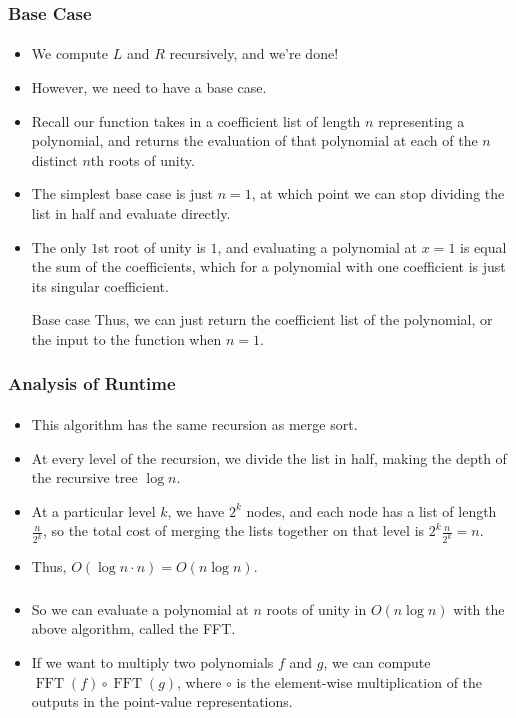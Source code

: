 \documentclass{beamer}                             %
\DeclareMathOperator{\FFT}{FFT}
\begin{document}
\begin{frame}
\frametitle{Base Case}
\framesubtitle{}
\begin{itemize}[<+->]
  \item We compute \( L \) and \( R \) recursively, and we're done!
  \item However, we need to have a base case.
  \item Recall our function takes in a coefficient list of length \( n \)
    representing a polynomial, and returns the evaluation of that polynomial
    at each of the \( n \) distinct \( n \)th roots of unity.
  \item The simplest base case is just \( n = 1 \), at which point
    we can stop dividing the list in half and evaluate directly.
  \item The only \( 1 \)st root of unity is \( 1 \), and evaluating a
    polynomial at \( x = 1 \) is equal the sum of the coefficients, which
    for a polynomial with one coefficient is just its singular coefficient.
    \begin{block}{Base case}
      Thus, we can just return the coefficient list of the polynomial,
      or the input to the function when \( n = 1 \). 
    \end{block}
\end{itemize}
\end{frame}

\begin{frame}
\frametitle{Analysis of Runtime}
\framesubtitle{}
\begin{itemize}[<+->]
  \item This algorithm has the same recursion as merge sort.
  \item At every level of the recursion, we divide the list in half,
    making the depth of the recursive tree \( \log n \).
  \item At a particular level \( k \), we have \( 2^k \) nodes, and each node
    has a list of length \( \frac{n}{2^k} \), so the total cost of merging
    the lists together on that level is \( 2^k \frac{n}{2^k} = n \).
  \item Thus, \( O(\log n \cdot n) = O(n \log n) \).
\end{itemize}
\end{frame}

\begin{frame}
\frametitle{}
\framesubtitle{}
\begin{itemize}[<+->]
  \item So we can evaluate a polynomial at \( n \) roots of unity in
    \( O(n \log n) \) with the above algorithm, called the \alert{FFT}.
  \item If we want to multiply two polynomials \( f \) and \( g \), we can
    compute \( \FFT(f) \circ \FFT(g) \), where \( \circ \) is the element-wise
    multiplication of the outputs in the point-value representations.
\end{itemize}
\end{frame}
\end{document}
